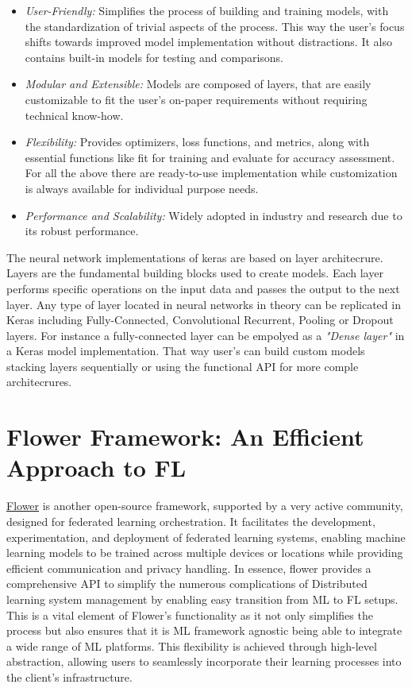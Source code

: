 \begin{itemize}
    \item \emph{User-Friendly:} Simplifies the process of building and training models, with the standardization of trivial aspects of the process. This way
          the user's focus shifts towards improved model implementation without distractions. It also contains built-in models for testing and comparisons.
    \item \emph{Modular and Extensible:} Models are composed of layers, that are easily customizable to fit the user's on-paper requirements without requiring technical know-how.
    \item \emph{Flexibility:} Provides optimizers, loss functions, and metrics, along with essential functions like fit for training and evaluate for accuracy assessment.
          For all the above there are ready-to-use implementation while customization is always available for individual purpose needs.
    \item \emph{Performance and Scalability:} Widely adopted in industry and research due to its robust performance.
\end{itemize}

The neural network implementations of keras are based on layer architecrure.  Layers are the fundamental building blocks used to create models. Each layer performs specific operations
on the input data and passes the output to the next layer. Any type of layer located in neural networks in theory can be replicated in Keras including Fully-Connected, Convolutional
Recurrent, Pooling or Dropout layers. For instance a fully-connected layer can be empolyed as a \emph{"Dense layer"} in a Keras model implementation. That way user's can build
custom models stacking layers sequentially or using the functional API for more comple architecrures.


\section{Flower Framework: An Efficient Approach to FL}
\label{sec:flower}
\href{https://flower.ai/}{Flower} is another open-source framework, supported by a very active community, designed for federated learning orchestration. It facilitates the development, experimentation, and
deployment of federated learning systems, enabling machine learning models to be trained across multiple devices or locations while providing efficient communication and privacy
handling. In essence, flower provides a comprehensive API to simplify the numerous complications of Distributed learning system management by enabling easy transition from ML to
FL setups. This is a vital element of Flower's functionality as it not only simplifies the process but also ensures that it is ML framework agnostic being able to integrate a
wide range of ML platforms. This flexibility is achieved through high-level abstraction, allowing users to seamlessly incorporate their learning processes into the client's
infrastructure.

